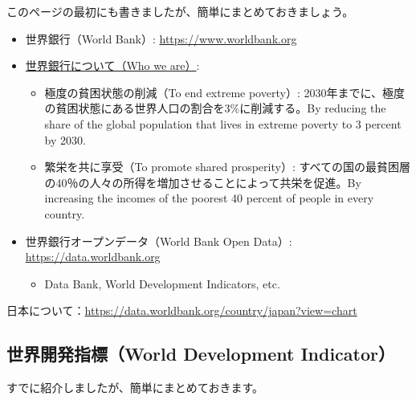 \documentclass[
  xelatex, ja=standard]{bxjsbook}
\providecommand{\tightlist}{%
  \setlength{\itemsep}{0pt}\setlength{\parskip}{0pt}}
\theoremstyle{definition}
\theoremstyle{definition}
\theoremstyle{definition}
\theoremstyle{definition}
\theoremstyle{remark}
\begin{document}
このページの最初にも書きましたが、簡単にまとめておきましょう。

\begin{itemize}
\tightlist
\item
  世界銀行（World Bank）: \url{https://www.worldbank.org}
\item
  \href{https://www.worldbank.org/en/who-we-are}{世界銀行について（Who we are）}:

  \begin{itemize}
  \tightlist
  \item
    極度の貧困状態の削減（To end extreme poverty）: 2030年までに、極度の貧困状態にある世界人口の割合を3\%に削減する。By reducing the share of the global population that lives in extreme poverty to 3 percent by 2030.
  \item
    繁栄を共に享受（To promote shared prosperity）: すべての国の最貧困層の40％の人々の所得を増加させることによって共栄を促進。By increasing the incomes of the poorest 40 percent of people in every country.
  \end{itemize}
\item
  世界銀行オープンデータ（World Bank Open Data）: \url{https://data.worldbank.org}

  \begin{itemize}
  \tightlist
  \item
    Data Bank, World Development Indicators, etc.
  \end{itemize}
\end{itemize}

日本について：\url{https://data.worldbank.org/country/japan?view=chart}

\hypertarget{ux4e16ux754cux958bux767aux6307ux6a19world-development-indicator}{%
\subsection{世界開発指標（World Development Indicator）}\label{ux4e16ux754cux958bux767aux6307ux6a19world-development-indicator}}

すでに紹介しましたが、簡単にまとめておきます。
\end{document}
